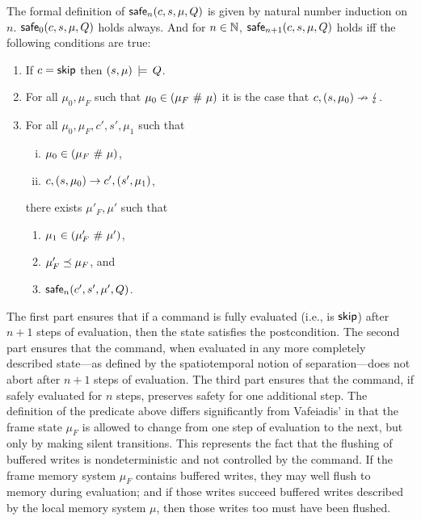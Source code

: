 \documentclass[11pt]{report}
\begin{document}
The formal definition of $\mathsf{safe}_{n}(c,s,\mu,Q)$ is given by natural number induction on $n$. $\mathsf{safe}_{0}(c,s,\mu,Q)$ holds always. And for $n \in \mathbb{N}$, $\mathsf{safe}_{n+1}(c,s,\mu,Q)$ holds iff the following conditions are true: \begin{enumerate}
    \item If $c = \operatorname{\mathsf{skip}}$ then $(s,\mu) \,\models\, Q$.

    \item For all $\mu_0,\mu_F$ such that $\mu_0 \in (\mu_F \operatorname{\,\#\,} \mu)$ it is the case that $c,(s,\mu_0) \nrightarrow \lightning$.

    \item For all $\mu_0,\mu_F,c',s',\mu_1$ such that \begin{enumerate}[(i)]
        \item $\mu_0 \in (\mu_F \operatorname{\,\#\,} \mu)$,
        \item $c,(s,\mu_0) \rightarrow c',(s',\mu_1)$,
    \end{enumerate} there exists $\mu'_F,\mu'$ such that \begin{enumerate}
        \item $\mu_1 \in (\mu'_F \operatorname{\,\#\,} \mu')$,
        \item $\mu'_F \preceq \mu_F$, and
        \item $\mathsf{safe}_{n}(c',s',\mu',Q)$.
    \end{enumerate}

\end{enumerate}

The first part ensures that if a command is fully evaluated (i.e., is $\operatorname{\mathsf{skip}}$) after $n+1$ steps of evaluation, then the state satisfies the postcondition. The second part ensures that the command, when evaluated in any more completely described state---as defined by the spatiotemporal notion of separation---does not abort after $n+1$ steps of evaluation. The third part ensures that the command, if safely evaluated for $n$ steps, preserves safety for one additional step. The definition of the predicate above differs significantly from Vafeiadis' in that the frame state $\mu_F$ is allowed to change from one step of evaluation to the next, but only by making silent transitions. This represents the fact that the flushing of buffered writes is nondeterministic and not controlled by the command. If the frame memory system $\mu_F$ contains buffered writes, they may well flush to memory during evaluation; and if those writes succeed buffered writes described by the local memory system $\mu$, then those writes too must have been flushed. 
\end{document}
